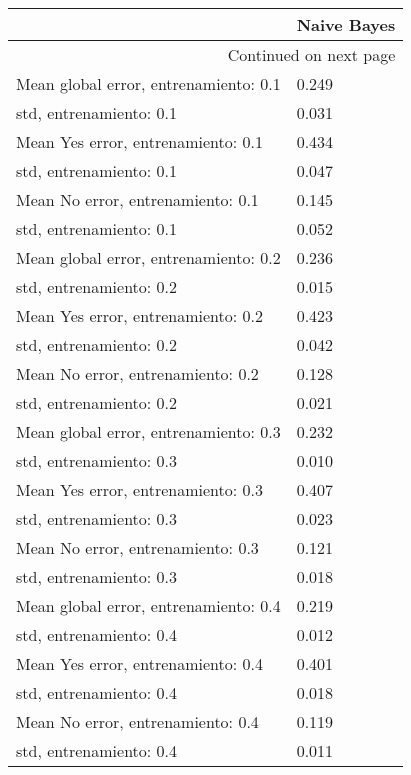 \begin{longtable}{p{4cm}|p{1.5cm}}
\toprule
{} &  Naive Bayes \\
\midrule
\endhead
\midrule
\multicolumn{2}{r}{{Continued on next page}} \\
\midrule
\endfoot

\bottomrule
\endlastfoot
Mean global error, entrenamiento: 0.1 &        0.249 \\
std, entrenamiento: 0.1               &        0.031 \\
Mean Yes error, entrenamiento: 0.1    &        0.434 \\
std, entrenamiento: 0.1               &        0.047 \\
Mean No error, entrenamiento: 0.1     &        0.145 \\
std, entrenamiento: 0.1               &        0.052 \\
Mean global error, entrenamiento: 0.2 &        0.236 \\
std, entrenamiento: 0.2               &        0.015 \\
Mean Yes error, entrenamiento: 0.2    &        0.423 \\
std, entrenamiento: 0.2               &        0.042 \\
Mean No error, entrenamiento: 0.2     &        0.128 \\
std, entrenamiento: 0.2               &        0.021 \\
Mean global error, entrenamiento: 0.3 &        0.232 \\
std, entrenamiento: 0.3               &        0.010 \\
Mean Yes error, entrenamiento: 0.3    &        0.407 \\
std, entrenamiento: 0.3               &        0.023 \\
Mean No error, entrenamiento: 0.3     &        0.121 \\
std, entrenamiento: 0.3               &        0.018 \\
Mean global error, entrenamiento: 0.4 &        0.219 \\
std, entrenamiento: 0.4               &        0.012 \\
Mean Yes error, entrenamiento: 0.4    &        0.401 \\
std, entrenamiento: 0.4               &        0.018 \\
Mean No error, entrenamiento: 0.4     &        0.119 \\
std, entrenamiento: 0.4               &        0.011 \\

\end{longtable}
